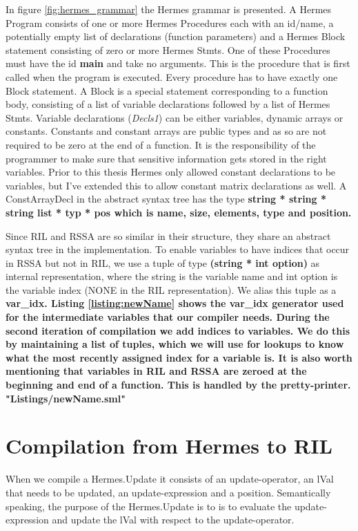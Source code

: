 
In figure \ref{fig:hermes_grammar} the Hermes grammar is presented.
A Hermes Program consists of one or more Hermes Procedures each with an id/name, a potentially empty list of declarations (function parameters) and a Hermes Block statement consisting of zero or more Hermes Stmts.
One of these Procedures must have the id \textbf{main} and take no arguments. This is the procedure that is first called when the program is executed.
Every procedure has to have exactly one Block statement. A Block is a special statement corresponding to a function body, consisting of a list of variable declarations followed by a list of Hermes Stmts.
Variable declarations (\emph{Decls1}) can be either variables, dynamic arrays or constants. Constants and constant arrays are public types and as so are not required to be zero at the end of a function. It is the responsibility of the programmer to make sure that sensitive information gets stored in the right variables.
Prior to this thesis Hermes only allowed constant declarations to be variables, but I've extended this to allow constant matrix declarations as well. A ConstArrayDecl in the abstract syntax tree has the type \bf{string * string * string list * typ * pos} which is name, size, elements, type and position.

Since RIL and RSSA are so similar in their structure, they share an abstract syntax tree in the implementation.
To enable variables to have indices that occur in RSSA but not in RIL, we use a tuple of type \textbf{(string * int option)} as internal representation, where the string is the variable name and int option is the variable index (NONE in the RIL representation).
We alias this tuple as a \bf{var\_idx}. Listing \ref{listing:newName} shows the \bf{var\_idx} generator used for the intermediate variables that our compiler needs.
During the second iteration of compilation we add indices to variables. We do this by maintaining a list of tuples, which we will use for lookups to know what the most recently assigned index for a variable is.
It is also worth mentioning that variables in RIL and RSSA are zeroed at the beginning and end of a function. This is handled by the pretty-printer.
 {"Listings/newName.sml"}

\section{Compilation from Hermes to RIL}
When we compile a Hermes.Update it consists of an update-operator, an lVal that needs to be updated, an update-expression and a position. Semantically speaking, the purpose of the Hermes.Update is to is to evaluate the update-expression and update the lVal with respect to the update-operator.


